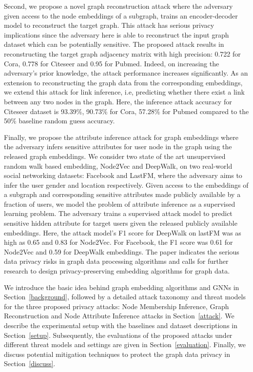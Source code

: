 Second, we propose a novel graph reconstruction attack where the adversary given access to the node embeddings of a subgraph, trains an encoder-decoder model to reconstruct the target graph.
This attack has serious privacy implications since the adversary here is able to reconstruct the input graph dataset which can be potentially sensitive.
The proposed attack results in reconstructing the target graph adjacency matrix with high precision: 0.722 for Cora, 0.778 for Citeseer and 0.95 for Pubmed.
Indeed, on increasing the adversary's prior knowledge, the attack performance increases significantly.
As an extension to reconstructing the graph data from the corresponding embeddings, we extend this attack for link inference, i.e, predicting whether there exist a link between any two nodes in the graph.
Here, the inference attack accuracy for Citeseer dataset is 93.39\%, 90.73\% for Cora, 57.28\% for Pubmed compared to the 50\% baseline random guess accuracy.


Finally, we propose the attribute inference attack for graph embeddings where the adversary infers sensitive attributes for user node in the graph using the released graph embeddings.
We consider two state of the art unsupervised random walk based embedding, Node2Vec and DeepWalk, on two real-world social networking datasets: Facebook and LastFM, where the adversary aims to infer the user gender and location respectively.
Given access to the embeddings of a subgraph and corresponding sensitive attributes made publicly available by a fraction of users, we model the problem of attribute inference as a supervised learning problem.
The adversary trains a supervised attack model to predict sensitive hidden attribute for target users given the released publicly available embeddings.
Here, the attack model's F1 score for DeepWalk on lastFM was as high as 0.65 and 0.83 for Node2Vec. For Facebook, the F1 score was 0.61 for Node2Vec and 0.59 for DeepWalk embeddings.
The paper indicates the serious data privacy risks in graph data processing algorithms and calls for further research to design privacy-preserving embedding algorithms for graph data.

We introduce the basic idea behind graph embedding algorithms and GNNs in Section~\ref{background}, followed by a detailed attack taxonomy and threat models for the three proposed privacy attacks: Node Membership Inference, Graph Reconstruction and Node Attribute Inference attacks in Section~\ref{attack}.
We describe the experimental setup with the baselines and dataset descriptions in Section~\ref{setup}.
Subsequently, the evaluations of the proposed attacks under different threat models and settings are given in Section~\ref{evaluation}.
Finally, we discuss potential mitigation techniques to protect the graph data privacy in Section~\ref{discuss}.
